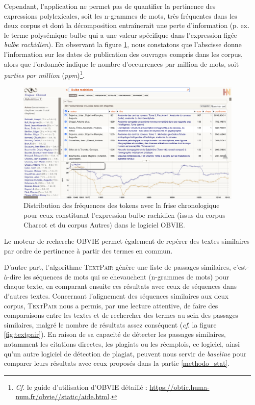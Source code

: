 Cependant, l'application ne permet pas de quantifier la pertinence des expressions polylexicales, soit les n-grammes de mots, très fréquentes dans les deux corpus et dont la décomposition entraînerait une perte d'information (p. ex. le terme polysémique \og{}bulbe\fg{} qui a une valeur spécifique dans l'expression figée \textit{bulbe rachidien}). En observant la figure \ref{fig:bulbe}, nous constatons que l'abscisse donne l'information sur les dates de publication des ouvrages compris dans les corpus, alors que l'ordonnée indique le nombre d'occurrences par million de mots, soit \textit{parties par million} (\textit{ppm})\footnote{\textit{Cf.} le guide d'utilisation d'\textsc{OBVIE} détaillé : \url{https://obtic.huma-num.fr/obvie//static/aide.html}.}. 
\begin{figure}[!ht]
    \centering
    \includegraphics[width=1\textwidth]{img/bulbe_rachidien_mini.png}
    \caption{Distribution des fréquences des tokens avec la frise chronologique pour ceux constituant l'expression \og{}bulbe rachidien\fg{} (issus du corpus \og{}Charcot\fg{} et du corpus \og{}Autres\fg{}) dans le logiciel OBVIE.
    }
    \label{fig:bulbe}
\end{figure}

Le moteur de recherche \textsc{OBVIE} permet également de repérer des textes similaires par ordre de pertinence à partir des termes en commun. 

D'autre part, l'algorithme \textsc{TextPair} génère une liste de passages similaires, c'est-à-dire les séquences de mots qui se chevauchent (n-grammes de mots) pour chaque texte, en comparant ensuite ces résultats avec ceux de séquences dans d'autres textes. Concernant l'alignement des séquences similaires aux deux corpus, \textsc{TextPair} nous a permis, par une lecture attentive, de faire des comparaisons entre les textes et de rechercher des termes au sein des passages similaires, malgré le nombre de résultats assez conséquent (\textit{cf}. la figure \ref{fig:textpair}). En raison de sa capacité de détecter les passages similaires, notamment les citations directes, les plagiats ou les réemplois, ce logiciel, ainsi qu'un autre logiciel de détection de plagiat, peuvent nous servir de \textit{baseline} pour comparer leurs résultats avec ceux proposés dans la partie \ref{methodo_stat}.

